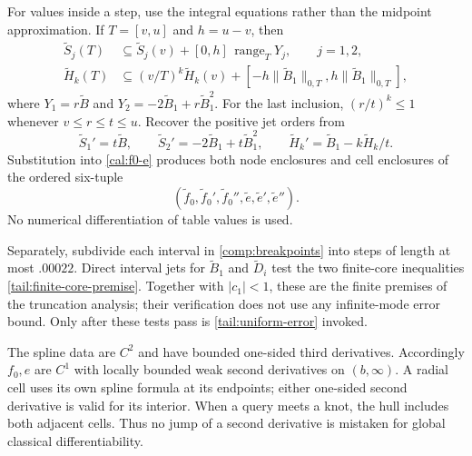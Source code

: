 For values inside a step, use the integral equations rather than
the midpoint approximation.  If $T=[v,u]$ and $h=u-v$, then
\begin{equation}\label{comp:cell-integrals}
 \begin{split}
 \widetilde S_j(T)&\subseteq \widetilde S_j(v)
                                  +[0,h]\,\operatorname{range}_T Y_j,
                         \qquad j=1,2,\\
 \widetilde H_k(T)&\subseteq (v/T)^k\widetilde H_k(v)
                  +[-h\|\widetilde B_1\|_{0,T},
                     h\|\widetilde B_1\|_{0,T}],
 \end{split}
\end{equation}
where $Y_1=r\widetilde B$ and
$Y_2=-2\widetilde B_1+r\widetilde B_1^2$.
For the last inclusion, $(r/t)^k\le1$ whenever $v\le r\le t\le u$.
Recover the positive jet orders from
\begin{equation}\label{comp:radial-odes}
 \widetilde S_1'=t\widetilde B,\qquad
 \widetilde S_2'=-2\widetilde B_1+t\widetilde B_1^2,\qquad
 \widetilde H_k'=\widetilde B_1-k\widetilde H_k/t.
\end{equation}
Substitution into \eqref{cal:f0-e} produces both node enclosures and
cell enclosures of the ordered six-tuple
\begin{equation}\label{comp:table-tuple}
 (\widetilde f_0,\widetilde f_0',\widetilde f_0'',
          \widetilde e,\widetilde e',\widetilde e'').
\end{equation}
No numerical differentiation of table values is used.

Separately, subdivide each interval in
\eqref{comp:breakpoints} into steps of length at most $.00022$.
Direct interval jets for $\widetilde B_1$ and $\widetilde D_i$
test the two finite-core inequalities
\eqref{tail:finite-core-premise}.  Together with $|c_1|<1$, these
are the finite premises of the truncation analysis; their verification
does not use any infinite-mode error bound.  Only after these tests
pass is \eqref{tail:uniform-error} invoked.

The spline data are $C^2$ and have bounded one-sided third
derivatives.  Accordingly $f_0,e$ are $C^1$ with locally bounded weak
second derivatives on $(b,\infty)$.  A radial cell uses its own spline
formula at its endpoints; either one-sided second derivative is
valid for its interior.  When a query meets a knot, the hull includes
both adjacent cells.  Thus no jump of a second derivative is mistaken
for global classical differentiability.

